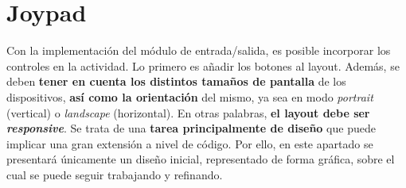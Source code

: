 \section{Joypad}

Con la implementación del módulo de entrada/salida, es posible incorporar los controles en la actividad. Lo primero es añadir los botones al layout. Además, se deben \textbf{tener en cuenta los distintos tamaños de pantalla} de los dispositivos, \textbf{así como la orientación} del mismo, ya sea en modo \textit{portrait} (vertical) o \textit{landscape} (horizontal). En otras palabras, \textbf{el layout debe ser \textit{responsive}}.
\clearpage
Se trata de una \textbf{tarea principalmente de diseño} que puede implicar una gran extensión a nivel de código. Por ello, en este apartado se presentará únicamente un diseño inicial, representado de forma gráfica, sobre el cual se puede seguir trabajando y refinando.

